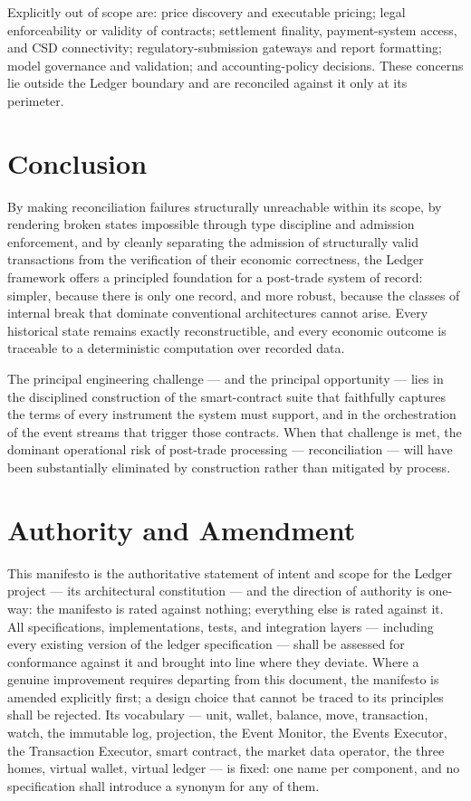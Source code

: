 \documentclass[11pt,a4paper]{article}
\begin{document}
Explicitly out of scope are: price discovery and executable pricing;
legal enforceability or validity of contracts; settlement finality,
payment-system access, and CSD connectivity; regulatory-submission
gateways and report formatting; model governance and validation; and
accounting-policy decisions. These concerns lie outside the Ledger
boundary and are reconciled against it only at its perimeter.

\hypertarget{conclusion}{%
\section{Conclusion}\label{conclusion}}

By making reconciliation failures structurally unreachable within its
scope, by rendering broken states impossible through type discipline and
admission enforcement, and by cleanly separating the admission of
structurally valid transactions from the verification of their economic
correctness, the Ledger framework offers a principled foundation for a
post-trade system of record: simpler, because there is only one record,
and more robust, because the classes of internal break that dominate
conventional architectures cannot arise. Every historical state remains
exactly reconstructible, and every economic outcome is traceable to a
deterministic computation over recorded data.

The principal engineering challenge --- and the principal opportunity
--- lies in the disciplined construction of the smart-contract suite
that faithfully captures the terms of every instrument the system must
support, and in the orchestration of the event streams that trigger
those contracts. When that challenge is met, the dominant operational
risk of post-trade processing --- reconciliation --- will have been
substantially eliminated by construction rather than mitigated by
process.

\hypertarget{authority-and-amendment}{%
\section{Authority and Amendment}\label{authority-and-amendment}}

This manifesto is the authoritative statement of intent and scope for
the Ledger project --- its architectural constitution --- and the
direction of authority is one-way: the manifesto is rated against
nothing; everything else is rated against it. All specifications,
implementations, tests, and integration layers --- including every
existing version of the ledger specification --- shall be assessed for
conformance against it and brought into line where they deviate. Where a
genuine improvement requires departing from this document, the manifesto
is amended explicitly first; a design choice that cannot be traced to
its principles shall be rejected. Its vocabulary --- unit, wallet,
balance, move, transaction, watch, the immutable log, projection, the
Event Monitor, the Events Executor, the Transaction Executor, smart
contract, the market data operator, the three homes, virtual wallet,
virtual ledger --- is fixed: one name per component, and no
specification shall introduce a synonym for any of them.
\end{document}
